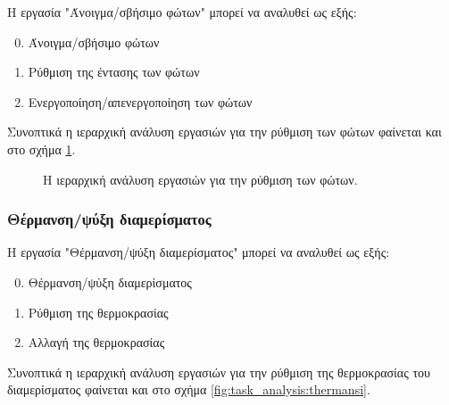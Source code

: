 \documentclass{assignment}
\begin{document}
Η εργασία "Άνοιγμα/σβήσιμο φώτων" μπορεί να αναλυθεί ως εξής:

\begin{enumerate}
\setcounter{enumi}{-1}
\item Άνοιγμα/σβήσιμο φώτων
\item Ρύθμιση της έντασης των φώτων
\item Ενεργοποίηση/απενεργοποίηση των φώτων
\end{enumerate}

Συνοπτικά η ιεραρχική ανάλυση εργασιών για την ρύθμιση των φώτων φαίνεται και στο σχήμα \ref{fig:task_analysis:fota}.

\begin{figure}
\begin{center}
\caption{Η ιεραρχική ανάλυση εργασιών για την ρύθμιση των φώτων.}
\label{fig:task_analysis:fota}
\end{center}
\end{figure}


\subsubsection{Θέρμανση/ψύξη διαμερίσματος}

Η εργασία "Θέρμανση/ψύξη διαμερίσματος" μπορεί να αναλυθεί ως εξής:

\begin{enumerate}
\setcounter{enumi}{-1}
\item Θέρμανση/ψύξη διαμερίσματος
\item Ρύθμιση της θερμοκρασίας
\item Αλλαγή της θερμοκρασίας
\end{enumerate}

Συνοπτικά η ιεραρχική ανάλυση εργασιών για την ρύθμιση της θερμοκρασίας του διαμερίσματος φαίνεται και στο σχήμα \ref{fig:task_analysis:thermansi}.
\end{document}
